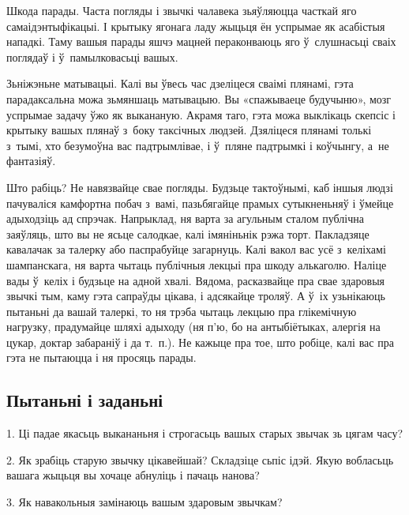 Шкода парады. Часта погляды і звычкі чалавека зьяўляюцца часткай яго самаідэнтыфікацыі. І крытыку ягонага ладу жыцьця ён успрымае як асабістыя нападкі. Таму вашыя парады яшчэ мацней пераконваюць яго ў~слушнасьці сваіх поглядаў і ў~памылковасьці вашых.

Зьніжэньне матывацыі. Калі вы ўвесь час дзеліцеся сваімі плянамі, гэта парадаксальна можа зьмяншаць матывацыю. Вы «спажываеце будучыню», мозг успрымае задачу ўжо як выкананую. Акрамя таго, гэта можа выклікаць скепсіс і крытыку вашых плянаў з~боку таксічных людзей. Дзяліцеся плянамі толькі з~тымі, хто безумоўна вас падтрымлівае, і ў~пляне падтрымкі і коўчынгу, а~не фантазіяў.

Што рабіць? Не навязвайце свае погляды. Будзьце тактоўнымі, каб іншыя людзі пачуваліся камфортна побач з~вамі, пазьбягайце прамых сутыкненьняў і ўмейце адыходзіць ад спрэчак. Напрыклад, ня варта за агульным сталом публічна заяўляць, што вы не ясьце салодкае, калі імяніньнік рэжа торт. Пакладзяце кавалачак за талерку або паспрабуйце загарнуць. Калі вакол вас усё з~келіхамі шампанскага, ня варта чытаць публічныя лекцыі пра шкоду алькаголю. Наліце вады ў~келіх і будзьце на адной хвалі. Вядома, расказвайце пра свае здаровыя звычкі тым, каму гэта сапраўды цікава, і адсякайце троляў. А ў~іх узьнікаюць пытаньні да вашай талеркі, то ня трэба чытаць лекцыю пра глікемічную нагрузку, прадумайце шляхі адыходу (ня п'ю, бо на антыбіётыках, алергія на цукар, доктар забараніў і да т.~п.). Не кажыце пра тое, што робіце, калі вас пра гэта не пытаюцца і ня просяць парады.

\subsection*{Пытаньні і заданьні}

1. Ці падае якасьць выкананьня і строгасьць вашых старых звычак зь цягам часу?

2. Як зрабіць старую звычку цікавейшай? Складзіце сьпіс ідэй. Якую вобласьць вашага жыцьця вы хочаце абнуліць і пачаць нанова?

3. Як навакольныя замінаюць вашым здаровым звычкам?
